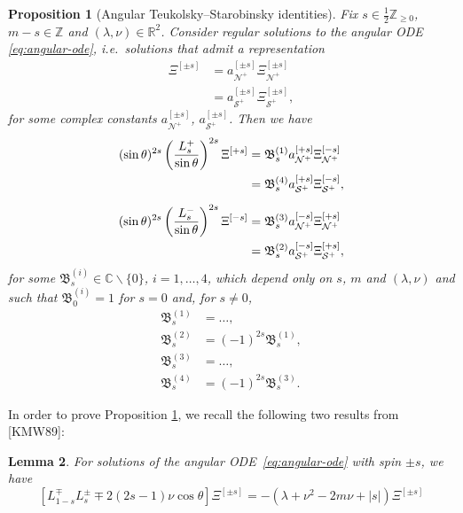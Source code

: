 \documentclass[11pt]{article}
\newtheorem{proposition}{Proposition}[section]
\newtheorem{lemma}[proposition]{Lemma}
\newcommand{\cN}{\mathcal N}
\newcommand{\cS}{\mathcal S}
\numberwithin{equation}{section}
\begin{document}
\begin{proposition}[Angular Teukolsky--Starobinsky identities]\label{prop:angular-ts} Fix $s\in \frac12\mathbb Z_{\geq0}$, $m-s\in\mathbb Z$ and $(\lambda,\nu)\in \mathbb R^2$. Consider regular solutions to the angular ODE \eqref{eq:angular-ode}, i.e.\ solutions that admit a representation
\begin{align*}
\Xi^{[\pm s]}&=a^{[\pm s]}_{\cN^+}\Xi^{[\pm s]}_{\cN^+}\\
&=a^{[\pm s]}_{\cS^+}\Xi^{[\pm s]}_{\cS^+},
\end{align*}
for some complex constants $a_{\cN^+}^{[\pm s]}$, $a_{\cS^+}^{[\pm s]}$. Then we have
\begin{align}
(\sin\theta)^{2s}\left(\frac{L^{+}_s}{\sin\theta}\right)^{2s}\Xi^{[+s]}
&=\mathfrak B^{(1)}_s a^{[+s]}_{\cN^+}\Xi^{[-s]}_{\cN^+} \notag\\
&=\mathfrak B^{(4)}_sa^{[+s]}_{\cS^+}\Xi^{[-s]}_{\cS^+},
\notag\\[2mm]
(\sin\theta)^{2s}\left(\frac{L^{-}_s}{\sin\theta}\right)^{2s}\Xi^{[-s]}
&=\mathfrak B^{(3)}_s a^{[-s]}_{\cN^+}\Xi^{[+s]}_{\cN^+}
\notag\\
&=\mathfrak B^{(2)}_sa^{[-s]}_{\cS^+}\Xi^{[+s]}_{\cS^+},
\label{eq:angular-TS-identities}
\end{align}
for some $\mathfrak B^{(i)}_s\in\mathbb C\backslash\{0\}$, $i=1,\dots,4$, which depend only on $s$, $m$ and $(\lambda,\nu)$ and such that $\mathfrak B^{(i)}_0=1$ for $s=0$ and, for $s\neq 0$,
\begin{align*}
 \mathfrak B^{(1)}_s&=\dots,\\
 \mathfrak B^{(2)}_s&=(-1)^{2s} \mathfrak B^{(1)}_s,\\
 \mathfrak B^{(3)}_s&=\dots,\\
 \mathfrak B^{(4)}_s&=(-1)^{2s} \mathfrak B^{(3)}_s.
\end{align*}
\end{proposition}

In order to prove Proposition \ref{prop:angular-ts}, we recall the following two results from [KMW89]:

\begin{lemma}\label{lem:angular-ode-L} For solutions of the angular ODE~\eqref{eq:angular-ode} with spin $\pm s$,  we have
\begin{equation}\label{eq:angular-ode-L}
\left[L^{\mp}_{1-s}L^{\pm}_s\mp2(2s-1)\nu\cos\theta\right]\Xi^{[\pm s]}=-(\lambda+\nu^2-2m\nu+|s|)\Xi^{[\pm s]}
\end{equation}
\end{lemma}
\end{document}
